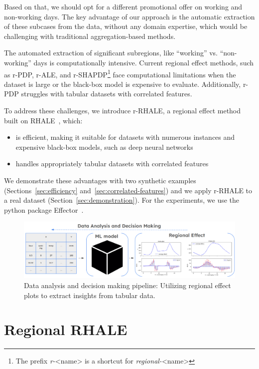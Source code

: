 \documentclass[sigconf, nonacm]{acmart}
\begin{document}
Based on that, we should opt for a different promotional offer on working and non-working days. The key advantage of our approach is the automatic extraction of these subcases from the data, without any domain expertise, which would be challenging with traditional aggregation-based methods.

The automated extraction of significant subregions, like ``working'' vs. ``non-working'' days is computationally intensive. Current regional effect methods, such as r-PDP, r-ALE, and r-SHAPDP\footnote{The prefix \textit{r-}<name> is a shortcut for \textit{regional-}<name>} face computational limitations when the dataset is large or the black-box model is expensive to evaluate. Additionally, r-PDP struggles with tabular datasets with correlated features.

To address these challenges, we introduce r-RHALE, a regional effect method built on RHALE~\cite{gkolemis2023rhale, gkolemis22a}, which:

\begin{itemize}
\item is efficient, making it suitable for datasets with numerous instances and expensive black-box models, such as deep neural networks
\item handles appropriately tabular datasets with correlated features
\end{itemize}

We demonstrate these advantages with two synthetic examples (Sections~\ref{sec:efficiency} and~\ref{sec:correlated-features}) and we apply r-RHALE to a real dataset (Section~\ref{sec:demonstration}). For the experiments, we use the python package Effector~\cite{gkolemis2024effector}.

\begin{figure}
    \centering
    \includegraphics[width=\textwidth]{figures/concept_image.png}
    \caption{Data analysis and decision making pipeline: Utilizing regional effect plots to extract insights from tabular data.}
    \label{fig:concept_figure}
\end{figure}

\section{Regional RHALE}
\end{document}

